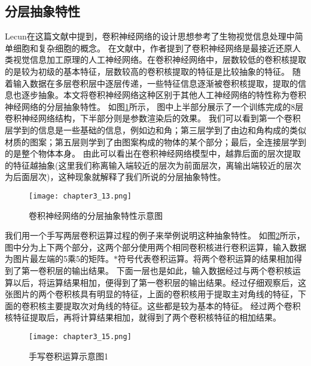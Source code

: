 \subsection{分层抽象特性}
Lecun在这篇文献\cite{726791}中提到，卷积神经网络的设计思想参考了生物视觉信息处理中简单细胞和复杂细胞\cite{hubel1962}的概念。
在文献\cite{2019arXiv190906161K}中，作者提到了卷积神经网络是最接近还原人类视觉信息加工原理的人工神经网络。在卷积神经网络中，层数较低的卷积核提取的是较为初级的基本特征，层数较高的卷积核提取的特征是比较抽象的特征。
随着输入数据在多层卷积层中逐层传递，一些特征信息逐渐被卷积核提取，提取的信息也逐步抽象。本文将卷积神经网络这种区别于其他人工神经网络的特性称为卷积神经网络的分层抽象特性。
如图\ref{fig:chapter3_13}所示， 图中上半部分展示了一个训练完成的8层卷积神经网络结构，下半部分则是参数渲染后的效果。
我们可以看到第一个卷积层学到的信息是一些基础的信息，例如边和角；第三层学到了由边和角构成的类似材质的图案；第五层则学到了由图案构成的物体的某个部分；最后，全连接层学到的是整个物体本身。
由此可以看出在卷积神经网络模型中，越靠后面的层次提取的特征越抽象(这里我们称离输入端较近的层次为前面层次，离输出端较近的层次为后面层次)，这种现象就解释了我们所说的分层抽象特性。
\begin{figure}
    \centering
    \texttt{[image: chapter3\_13.png]}
    \caption{卷积神经网络的分层抽象特性示意图\cite{luyujie2018}}
    \label{fig:chapter3_13}
\end{figure}


我们用一个手写两层卷积运算过程的例子来举例说明这种抽象特性。
如图\ref{fig:chapter3_15}所示，图中分为上下两个部分，这两个部分使用两个相同卷积核进行卷积运算，输入数据为图片最左端的5乘5的矩阵。$\ast$符号代表卷积运算。将两个卷积运算的结果相加得到了第一卷积层的输出结果。
下面一层也是如此，输入数据经过与两个卷积核运算以后，将运算结果相加，便得到了第一卷积层的输出结果。经过仔细观察后，这张图片的两个卷积核具有明显的特征，上面的卷积核用于提取主对角线的特征，下面的卷积核主要提取次对角线的特征。这些都是较为基本的特征。
经过两个卷积核特征提取后，再将计算结果相加，就得到了两个卷积核特征的相加结果。
\begin{figure}
    \centering
    \texttt{[image: chapter3\_15.png]}
    \caption{手写卷积运算示意图1}
    \label{fig:chapter3_15}
\end{figure}

